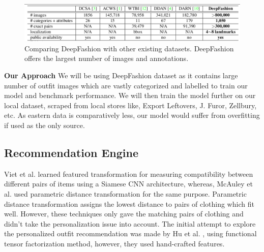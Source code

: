 \begin{figure}[H]
\includegraphics[width=15cm]{images/dataset-comparision.pdf} 
\centering
\caption{Comparing DeepFashion with other existing datasets. DeepFashion offers the largest number of images and annotations.}
\label{dataset:home}
\end{figure}

 
\noindent\textbf{Our Approach} \newline
We will be using DeepFashion dataset as it contains large number of outfit images which are vastly categorized and labelled to train our model and benchmark performance. We will then train the model further on our local dataset, scraped from local stores like, Export Leftovers, J. Furor, Zellbury, etc. As eastern data is comparatively less, our model would suffer from overfitting if used as the only source. 

\subsection{Recommendation Engine}


Viet et al. \cite{paper4} learned featured transformation for measuring compatibility between different pairs of items using a Siamese CNN architecture, whereas, McAuley et al.\cite{paper5} used parametric distance transformation for the same purpose. Parametric distance transformation assigns the lowest distance to pairs of clothing which fit well. However, these techniques only gave the matching pairs of clothing and didn’t take the personalization issue into account. The initial attempt to explore the personalized outfit recommendation was made by Hu et al. \cite{paperseven}, using functional tensor factorization method, however, they used hand-crafted features.  \newline

